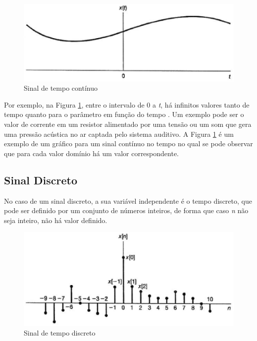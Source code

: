 \begin{figure}[h]
	\centering
	\includegraphics[scale=0.5]{figuras/fig01.eps}
	\caption{Sinal de tempo contínuo \cite{oppenheim2010sinais}}
	\label{fig01}
\end{figure}

Por exemplo, na Figura \ref{fig01}, entre o intervalo de 0 a \textit{t}, há infinitos valores tanto de tempo quanto para o parâmetro em função do tempo \cite{oppenheim2010sinais}. Um exemplo pode ser o valor de corrente em um resistor alimentado por uma tensão ou um som que gera uma pressão acústica no ar captada pelo sistema auditivo. A Figura \ref{fig01} é um exemplo de um gráfico para um sinal contínuo no tempo no qual se pode observar que para cada valor domínio há um valor correspondente. 


\subsection{Sinal Discreto}
No caso de um sinal discreto, a sua variável independente é o tempo discreto, que pode ser definido por um conjunto de números inteiros, de forma que caso \textit{n} não seja inteiro, não há valor definido. 

\begin{figure}[h]
	\centering
    \includegraphics[scale=0.5]{figuras/fig02.eps}
	\caption{Sinal de tempo discreto \cite{oppenheim2010sinais}}
	\label{fig02}
\end{figure}

